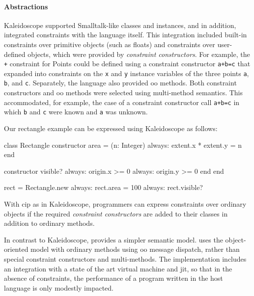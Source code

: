 \paragraph{Abstractions}
Kaleidoscope supported Smalltalk-like classes and instances, and in
addition, integrated constraints with the language itself. This
integration included built-in constraints over primitive objects (such
as floats) and constraints over user-defined objects, which were
provided by \emph{constraint constructors}.  For example, the
\lstinline{+} constraint for Points could be defined using a
constraint constructor \lstinline{a+b=c} that expanded into
constraints on the \lstinline{x} and \lstinline{y} instance variables
of the three points \lstinline{a}, \lstinline{b}, and \lstinline{c}.
Separately, the language also provided \ac{oo} methods.  Both constraint
constructors and \ac{oo} methods were selected using multi-method semantics.
This accommodated, for example, the case of a constraint constructor
call \lstinline{a+b=c} in which \lstinline{b} and \lstinline{c} were
known and \lstinline{a} was unknown.

Our rectangle example can be expressed using Kaleidoscope as follows:
\begin{code}
class Rectangle
  constructor area = (n: Integer)
    always: extent.x * extent.y = n
  end

  constructor visible?
    always: origin.x >= 0
    always: origin.y >= 0
  end
end

rect = Rectangle.new
always: rect.area = 100
always: rect.visible?
\end{code}

With \ac{cip} as in Kaleidoscope, programmers can express constraints
over ordinary objects if the required \emph{constraint constructors}
are added to their classes in addition to ordinary methods.

In contrast to Kaleidoscope, \langname provides a simpler semantic
model. \langname uses the \DIFdelbegin {}\DIFdelend object-oriented model with ordinary
methods using \ac{oo} message dispatch, rather than special constraint
constructors and multi-methods.  The implementation includes an
integration with a state of the art virtual machine and \ac{jit}, so
that in the absence of constraints, the performance of a program
written in the host language is only modestly impacted.

